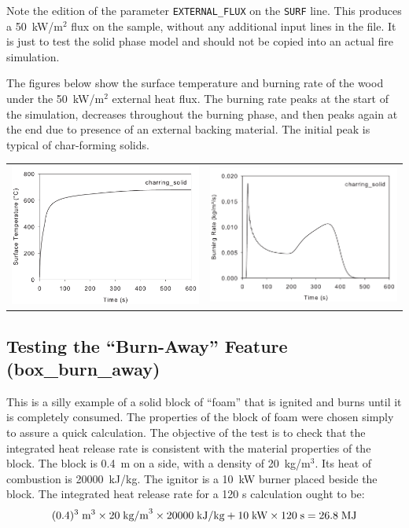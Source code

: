 \documentclass[11pt]{book}
\newcommand{\ct}{\tt\small}
\newcommand{\be}{\begin{equation}}
\newcommand{\ee}{\end{equation}}
\begin{document}
\noindent
Note the edition of the parameter {\ct EXTERNAL\_FLUX} on the {\ct SURF} line. This produces a 50~kW/m$^2$ flux on the sample, without any
additional input lines in the file. It is just to test the solid phase model and should not be copied into an actual fire simulation.

The figures below show the surface temperature and burning rate of the wood under the 50~kW/m$^2$ external heat flux. The burning rate peaks at the
start of the simulation, decreases throughout the burning phase, and then peaks again at the end due to presence of an external backing material. The
initial peak is typical of char-forming solids.

\noindent
\begin{tabular*}{\textwidth}{lr}
\includegraphics[width=3.2in]{FIGURES/charring_solid_Surface_Temperature} &
\includegraphics[width=3.2in]{FIGURES/charring_solid_Burning_Rate}
\end{tabular*}





\clearpage
\subsection{Testing the ``Burn-Away'' Feature ({\bf box\_burn\_away}) }
\label{box_burn_away}

This is a silly example of a solid block of ``foam'' that is ignited
and burns until it is completely consumed.  The properties of the
block of foam were chosen simply to assure a quick calculation. The
objective of the test is to check that the integrated heat release
rate is consistent with the material properties of the block.  The
block is 0.4~m on a side, with a density of 20~kg/m$^3$. Its heat of
combustion is 20000~kJ/kg. The ignitor is a 10~kW burner placed beside
the block. The integrated heat release rate for a 120 s calculation
ought to be:
\be
(0.4)^3 \; \hbox{m}^3 \times 20 \; \hbox{kg/m}^3
\times 20000 \; \hbox{kJ/kg} + 10 \; \hbox{kW} \times 120 \; \hbox{s} =
26.8 \; \hbox{MJ}
\ee
\end{document}
